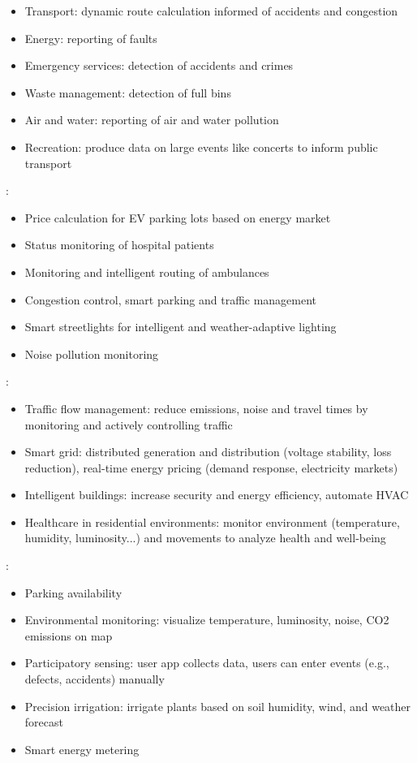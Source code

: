 \documentclass[]{scrartcl}
\begin{document}
\cite[p.~7~f.]{Petrolo.2017}
\begin{itemize}
	\item Transport: dynamic route calculation informed of accidents and congestion
	\item Energy: reporting of faults
	\item Emergency services: detection of accidents and crimes
	\item Waste management: detection of full bins
	\item Air and water: reporting of air and water pollution
	\item Recreation: produce data on large events like concerts to inform public transport
\end{itemize}

\cite[p.~8~ff.]{Alavi.2018}:
\begin{itemize}
	\item Price calculation for EV parking lots based on energy market
	\item Status monitoring of hospital patients
	\item Monitoring and intelligent routing of ambulances
	\item Congestion control, smart parking and traffic management
	\item Smart streetlights for intelligent and weather-adaptive lighting
	\item Noise pollution monitoring
\end{itemize}

\cite[p.~209~ff.]{Angelakis.2017}:
\begin{itemize}
	\item Traffic flow management: reduce emissions, noise and travel times by monitoring and actively controlling traffic
	\item Smart grid: distributed generation and distribution (voltage stability, loss reduction), real-time energy pricing (demand response, electricity markets)
	\item Intelligent buildings: increase security and energy efficiency, automate HVAC
	\item Healthcare in residential environments:  monitor environment (temperature, humidity, luminosity...) and movements to analyze health and well-being
\end{itemize}

\cite[p.~16]{Fernandes.2012}:
\begin{itemize}
	\item Parking availability
	\item Environmental monitoring: visualize temperature, luminosity, noise, CO2 emissions on map
	\item Participatory sensing: user app collects data, users can enter events (e.g., defects, accidents) manually
	\item Precision irrigation: irrigate plants based on soil humidity, wind, and weather forecast
	\item Smart energy metering
\end{itemize}
\end{document}
